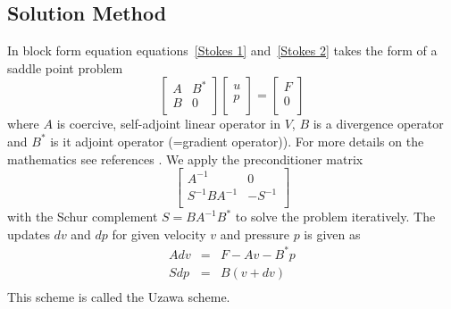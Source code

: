 \subsection{Solution Method \label{STOKES SOLVE}}
In block form equation equations~\ref{Stokes 1} and~\ref{Stokes 2} takes the form of a saddle point problem
\begin{equation}
\left[ \begin{array}{cc}
A     & B^{*} \\
B & 0 \\
\end{array} \right]
\left[ \begin{array}{c}
u \\
p \\
\end{array} \right]
=\left[ \begin{array}{c}
F \\
0 \\
\end{array} \right]
\label{SADDLEPOINT}
\end{equation}
where $A$ is coercive, self-adjoint linear operator in $V$, $B$ is a divergence operator and $B^{*}$ is it adjoint operator (=gradient operator)). For more details on the mathematics see references \cite{AAMIRBERKYAN2008,MBENZI2005}.
We apply the preconditioner matrix
\begin{equation}
\left[ \begin{array}{cc}
A^{-1}     & 0 \\
S^{-1} B A^{-1}  & -S^{-1} \\
\end{array} \right]
\label{SADDLEPOINT PRECODITIONER}
\end{equation}
with the Schur complement $S=BA^{-1}B^{*}$ to solve the problem iteratively. The updates $dv$ and $dp$ for 
given velocity $v$ and pressure $p$ is given as
\begin{equation}
\begin{array}{rcl}
A dv & = & F-Av-B^{*}p \\
S dp & = & B(v+dv) \\
\end{array}
\label{SADDLEPOINT iteration}
\end{equation}
This scheme is called the Uzawa scheme. 

